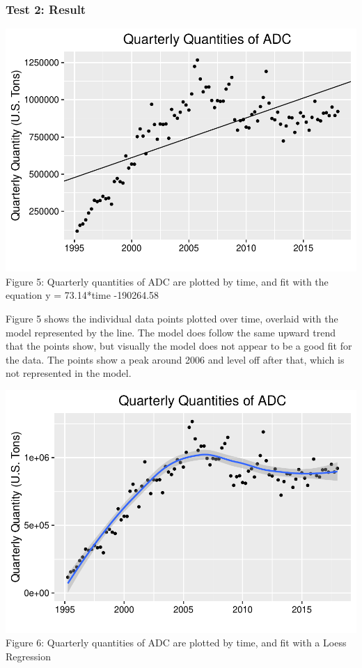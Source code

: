 \documentclass[12pt,]{article}
\begin{document}
\subsubsection{Test 2: Result}\label{test-2-result}

\includegraphics{SKo_Project_Template_files/figure-latex/Test2_2-1.pdf}
Figure 5: Quarterly quantities of ADC are plotted by time, and fit with
the equation y = 73.14*time -190264.58

Figure 5 shows the individual data points plotted over time, overlaid
with the model represented by the line. The model does follow the same
upward trend that the points show, but visually the model does not
appear to be a good fit for the data. The points show a peak around 2006
and level off after that, which is not represented in the model.

\includegraphics{SKo_Project_Template_files/figure-latex/Test2_3-1.pdf}
Figure 6: Quarterly quantities of ADC are plotted by time, and fit with
a Loess Regression
\end{document}
